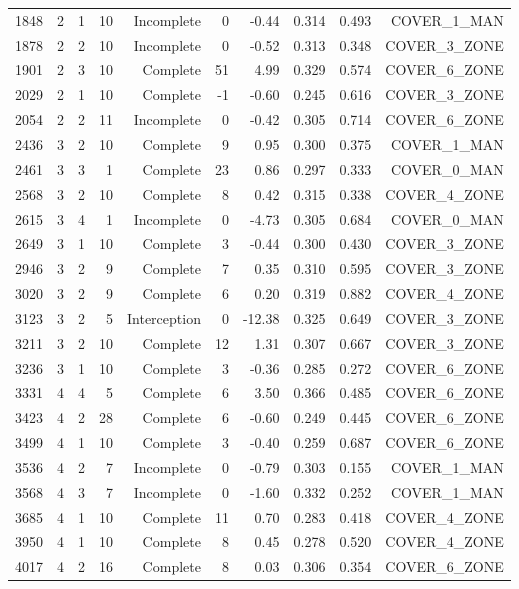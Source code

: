 \begin{tabular}{rrrrrrrrrr}
1848 & 2 & 1 & 10 & Incomplete & 0 & -0.44 & 0.314 & 0.493 & COVER\_1\_MAN \\
1878 & 2 & 2 & 10 & Incomplete & 0 & -0.52 & 0.313 & 0.348 & COVER\_3\_ZONE \\
1901 & 2 & 3 & 10 & Complete & 51 & 4.99 & 0.329 & 0.574 & COVER\_6\_ZONE \\
2029 & 2 & 1 & 10 & Complete & -1 & -0.60 & 0.245 & 0.616 & COVER\_3\_ZONE \\
2054 & 2 & 2 & 11 & Incomplete & 0 & -0.42 & 0.305 & 0.714 & COVER\_6\_ZONE \\
2436 & 3 & 2 & 10 & Complete & 9 & 0.95 & 0.300 & 0.375 & COVER\_1\_MAN \\
2461 & 3 & 3 & 1 & Complete & 23 & 0.86 & 0.297 & 0.333 & COVER\_0\_MAN \\
2568 & 3 & 2 & 10 & Complete & 8 & 0.42 & 0.315 & 0.338 & COVER\_4\_ZONE \\
2615 & 3 & 4 & 1 & Incomplete & 0 & -4.73 & 0.305 & 0.684 & COVER\_0\_MAN \\
2649 & 3 & 1 & 10 & Complete & 3 & -0.44 & 0.300 & 0.430 & COVER\_3\_ZONE \\
2946 & 3 & 2 & 9 & Complete & 7 & 0.35 & 0.310 & 0.595 & COVER\_3\_ZONE \\
3020 & 3 & 2 & 9 & Complete & 6 & 0.20 & 0.319 & 0.882 & COVER\_4\_ZONE \\
3123 & 3 & 2 & 5 & Interception & 0 & -12.38 & 0.325 & 0.649 & COVER\_3\_ZONE \\
3211 & 3 & 2 & 10 & Complete & 12 & 1.31 & 0.307 & 0.667 & COVER\_3\_ZONE \\
3236 & 3 & 1 & 10 & Complete & 3 & -0.36 & 0.285 & 0.272 & COVER\_6\_ZONE \\
3331 & 4 & 4 & 5 & Complete & 6 & 3.50 & 0.366 & 0.485 & COVER\_6\_ZONE \\
3423 & 4 & 2 & 28 & Complete & 6 & -0.60 & 0.249 & 0.445 & COVER\_6\_ZONE \\
3499 & 4 & 1 & 10 & Complete & 3 & -0.40 & 0.259 & 0.687 & COVER\_6\_ZONE \\
3536 & 4 & 2 & 7 & Incomplete & 0 & -0.79 & 0.303 & 0.155 & COVER\_1\_MAN \\
3568 & 4 & 3 & 7 & Incomplete & 0 & -1.60 & 0.332 & 0.252 & COVER\_1\_MAN \\
3685 & 4 & 1 & 10 & Complete & 11 & 0.70 & 0.283 & 0.418 & COVER\_4\_ZONE \\
3950 & 4 & 1 & 10 & Complete & 8 & 0.45 & 0.278 & 0.520 & COVER\_4\_ZONE \\
4017 & 4 & 2 & 16 & Complete & 8 & 0.03 & 0.306 & 0.354 & COVER\_6\_ZONE \\
\bottomrule
\end{tabular}
